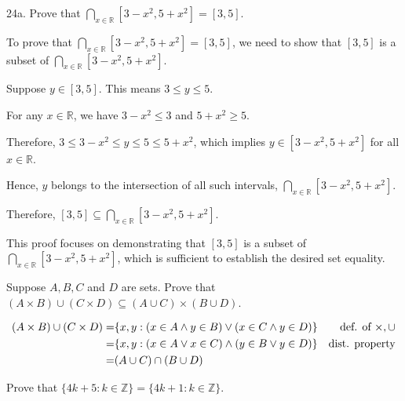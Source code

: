 \documentclass[openany, 12pt]{book}
\begin{document}
\begin{exercise}{}{}
	{24a. Prove that $\bigcap_{x \in \mathbb{R}}\left[3-x^2, 5+x^2\right]=[3,5]$.}
	\begin{alist}
		\item
		To prove that $\bigcap_{x \in \mathbb{R}}\left[3-x^2,
				5+x^2\right]=[3,5]$, we need to show that $[3,5]$ is a subset of
		$\bigcap_{x \in \mathbb{R}}\left[3-x^2, 5+x^2\right]$.
		\item Suppose $y \in [3,5]$. This means $3 \leq y \leq 5$.
		\item For any $x \in \mathbb{R}$, we have $3 - x^2 \leq 3$ and $5 + x^2 \geq 5$.
		\item Therefore, $3 \leq 3 - x^2 \leq y \leq 5 \leq 5 + x^2$, which implies $y \in \left[3-x^2, 5+x^2\right]$ for all $x \in \mathbb{R}$.
		\item Hence, $y$ belongs to the intersection of all such intervals, $\bigcap_{x \in \mathbb{R}}\left[3-x^2, 5+x^2\right]$.
		\item Therefore, $[3,5] \subseteq \bigcap_{x \in \mathbb{R}}\left[3-x^2, 5+x^2\right]$.
	\end{alist}
\end{exercise}

This proof focuses on demonstrating that $[3,5]$ is a subset of $\bigcap_{x \in
		\mathbb{R}}\left[3-x^2, 5+x^2\right]$, which is sufficient to establish the
desired set equality.

\begin{exercise}{}{}
	Suppose $A, B, C$ and $D$ are sets. Prove that $(A \times
		B) \cup(C \times D) \subseteq(A \cup C) \times(B \cup D)$.

	\begin{align*}
		(A\times B)\cup (C\times D)= & \{x, y: (x\in A \land y\in B) \lor (x\in C
		\land y\in D) \}              & \text{def. of }\times,\cup                                                \\
		=                            & \{x,y: (x\in A \lor x\in C) \land (y\in B \lor y\in D) \} & \text{dist.
		property}                                                                                                \\
		=                            & (A\cup C) \cap (B\cup D)
	\end{align*}
\end{exercise}

\begin{exercise}{}{}
	Prove that $\{4 k+5: k \in \mathbb{Z}\}=\{4 k+1: k \in \mathbb{Z}\}$.
\end{exercise}
\end{document}
